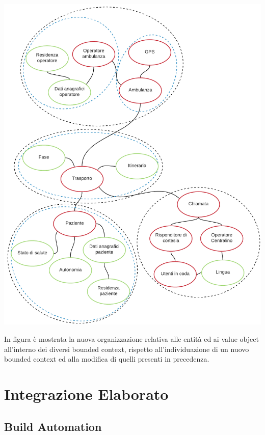 \documentclass[12pt]{article}
\begin{document}
\centerline{\includegraphics[width=15cm]{fig/BoundedContext2.png}}

In figura è mostrata la nuova organizzazione relativa alle entità ed ai value object all'interno dei diversi bounded context, rispetto all'individuazione di un nuovo bounded context ed alla modifica di quelli presenti in precedenza. 


\section{Integrazione Elaborato}
\subsection{Build Automation}
\end{document}
